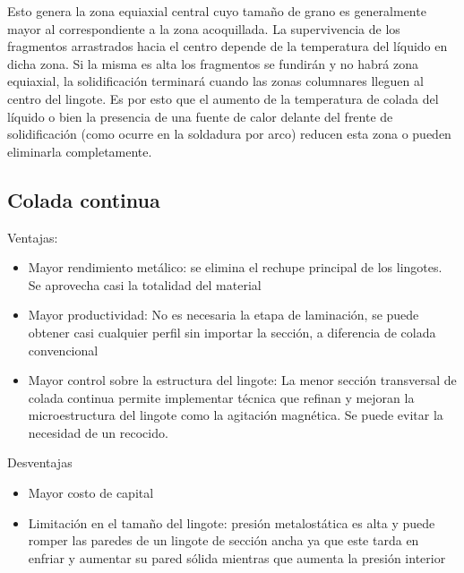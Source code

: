 Esto genera la zona equiaxial central cuyo tamaño de grano es generalmente mayor al correspondiente a la zona acoquillada. La supervivencia de los fragmentos arrastrados hacia el centro depende de la temperatura del líquido en dicha zona. Si la misma es alta los fragmentos se fundirán y no habrá zona equiaxial, la solidificación terminará cuando las zonas columnares lleguen al centro del lingote. Es por esto que el aumento de la temperatura de colada del líquido o bien la presencia de una fuente de calor delante del frente de solidificación (como ocurre en la soldadura por arco) reducen esta zona o pueden eliminarla completamente.

\subsection{Colada continua}

Ventajas:

\begin{itemize}
	\item Mayor rendimiento metálico: se elimina el rechupe principal de los lingotes. Se aprovecha casi la totalidad del material
	\item Mayor productividad: No es necesaria la etapa de laminación, se puede obtener casi cualquier perfil sin importar la sección, a diferencia de colada convencional
	\item Mayor control sobre la estructura del lingote: La menor sección transversal de colada continua permite implementar técnica que refinan y mejoran la microestructura del lingote como la agitación magnética. Se puede evitar la necesidad de un recocido.
\end{itemize}

Desventajas

\begin{itemize}
	\item Mayor costo de capital
	\item Limitación en el tamaño del lingote: presión metalostática es alta y puede romper las paredes de un lingote de sección ancha ya que este tarda en enfriar y aumentar su pared sólida mientras que aumenta la presión interior
\end{itemize}